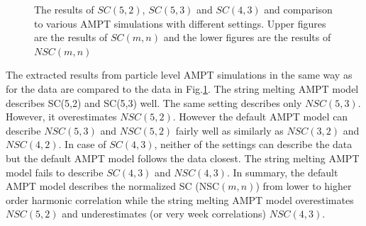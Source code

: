 \begin{figure}[h]
\begin{center}
        \caption{The results of  $SC(5,2)$, $SC(5,3)$ and $SC(4,3)$ and comparison to various AMPT simulations with different settings.  Upper figures are the results of $SC(m,n)$ and the lower figures are the results of $NSC(m,n)$}
        \label{AMPTcomhigh}
        \end{center}   
     \end{figure}
     
     
The extracted results  from particle level AMPT simulations in the same way as for the data are compared to the data in Fig.\ref{AMPTcomhigh}.
The string melting AMPT model describes SC(5,2) and SC(5,3) well. The same setting describes only $NSC(5,3)$. However, it overestimates $NSC(5,2)$. 
However the default AMPT model can describe $NSC(5,3)$ and $NSC(5,2)$ fairly well as similarly as $NSC(3,2)$ and $NSC(4,2)$.
In case of $SC(4,3)$, neither of the settings can describe the data but the default AMPT model follows the data closest. 
The string melting AMPT model fails to describe $SC(4,3)$ and $NSC(4,3)$.
In summary, the default AMPT model describes the normalized SC (NSC$(m,n)$) from lower to higher order harmonic correlation while the string melting AMPT model overestimates $NSC(5,2)$ and 
underestimates (or very week correlations) $NSC(4,3)$. 
     

